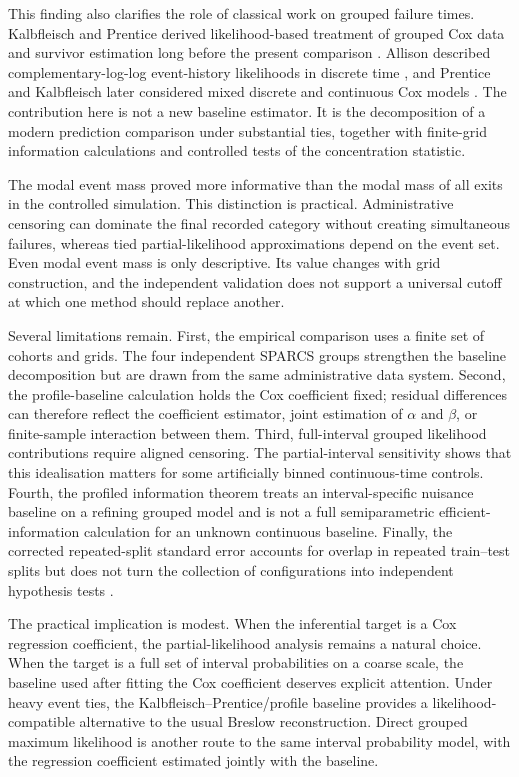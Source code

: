 \documentclass[smallextended,natbib]{svjour3}
\begin{document}
This finding also clarifies the role of classical work on grouped failure times. Kalbfleisch and Prentice derived likelihood-based treatment of grouped Cox data and survivor estimation long before the present comparison \citep{kalbfleisch1973}. Allison described complementary-log-log event-history likelihoods in discrete time \citep{allison1982}, and Prentice and Kalbfleisch later considered mixed discrete and continuous Cox models \citep{prentice2003}. The contribution here is not a new baseline estimator. It is the decomposition of a modern prediction comparison under substantial ties, together with finite-grid information calculations and controlled tests of the concentration statistic.

The modal event mass proved more informative than the modal mass of all exits in the controlled simulation. This distinction is practical. Administrative censoring can dominate the final recorded category without creating simultaneous failures, whereas tied partial-likelihood approximations depend on the event set. Even modal event mass is only descriptive. Its value changes with grid construction, and the independent validation does not support a universal cutoff at which one method should replace another.

Several limitations remain. First, the empirical comparison uses a finite set of cohorts and grids. The four independent SPARCS groups strengthen the baseline decomposition but are drawn from the same administrative data system. Second, the profile-baseline calculation holds the Cox coefficient fixed; residual differences can therefore reflect the coefficient estimator, joint estimation of $\alpha$ and $\beta$, or finite-sample interaction between them. Third, full-interval grouped likelihood contributions require aligned censoring. The partial-interval sensitivity shows that this idealisation matters for some artificially binned continuous-time controls. Fourth, the profiled information theorem treats an interval-specific nuisance baseline on a refining grouped model and is not a full semiparametric efficient-information calculation for an unknown continuous baseline. Finally, the corrected repeated-split standard error accounts for overlap in repeated train--test splits but does not turn the collection of configurations into independent hypothesis tests \citep{nadeau2003}.

The practical implication is modest. When the inferential target is a Cox regression coefficient, the partial-likelihood analysis remains a natural choice. When the target is a full set of interval probabilities on a coarse scale, the baseline used after fitting the Cox coefficient deserves explicit attention. Under heavy event ties, the Kalbfleisch--Prentice/profile baseline provides a likelihood-compatible alternative to the usual Breslow reconstruction. Direct grouped maximum likelihood is another route to the same interval probability model, with the regression coefficient estimated jointly with the baseline.
\end{document}
